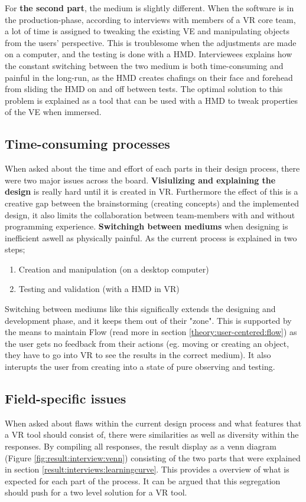  For \textbf{the second part}, the medium is slightly different. When the software is in the production-phase, according to interviews with members of a VR core team, a lot of time is assigned to tweaking the existing VE and manipulating objects from the users' perspective. This is troublesome when the adjustments are made on a computer, and the testing is done with a HMD. Interviewees explains how the constant switching between the two medium is both time-consuming and painful in the long-run, as the HMD creates chafings on their face and forehead from sliding the HMD on and off between tests. The optimal solution to this problem is explained as a tool that can be used with a HMD to tweak properties of the VE when immersed.
 \subsection{Time-consuming processes}
 When asked about the time and effort of each parts in their design process, there were two major issues across the board. \textbf{Visiulizing and explaining the design} is really hard until it is created in VR. Furthermore the effect of this is a creative gap between the brainstorming (creating concepts) and the implemented design, it also limits the collaboration between team-members with and without programming experience. \textbf{Switchingh between mediums} when designing is inefficient aswell as physically painful. As the current process is explained in two steps; \begin{enumerate}
   \item Creation and manipulation (on a desktop computer)
   \item Testing and validation (with a HMD in VR)
 \end{enumerate}
Switching between mediums like this significally extends the designing and development phase, and it keeps them out of their "zone". This is supported by the means to maintain Flow (read more in section \ref{theory:user-centered:flow}) as the user gets no feedback from their actions (eg. moving or creating an object, they have to go into VR to see the results in the correct medium). It also interupts the user from creating into a state of pure observing and testing.
\subsection{Field-specific issues}
When asked about flaws within the current design process and what features that a VR tool should consist of, there were similarities as well as diversity within the responses. By compiling all responses, the result display as a venn diagram (Figure \ref{fig:result:interview:venn}) consisting of the two parts that were explained in section \ref{result:interviews:learningcurve}. This provides a overview of what is expected for each part of the process. It can be argued that this segregation should push for a two level solution for a VR tool.
